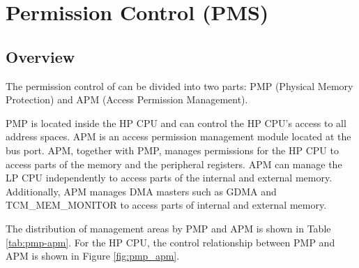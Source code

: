 \documentclass[main\_\_EN.tex]{subfiles}
\begin{document}

\ifglobal
\else
    \listoftodos
    {\let\clearpage\relax \listofdonetodos}
    \tableofcontents
\fi



\hypertarget{permctrl}{}
\chapter{Permission Control (PMS)}
\label{mod:permctrl}

\section{Overview}

The permission control of \chipname{} can be divided into two parts: PMP (Physical Memory Protection) and APM (Access Permission Management).

PMP is located inside the HP CPU and can control the HP CPU's access to all address spaces. APM is an access permission management module located at the bus port. APM, together with PMP, manages permissions for the HP CPU to access parts of the memory and the peripheral registers. APM can manage the LP CPU independently to access parts of the internal and external memory. Additionally, APM manages DMA masters such as GDMA and TCM\_MEM\_MONITOR to access parts of internal and external memory.

The distribution of management areas by PMP and APM is shown in Table \ref{tab:pmp-apm}. For the HP CPU, the control relationship between PMP and APM is shown in Figure \ref{fig:pmp_apm}.
\end{document}
